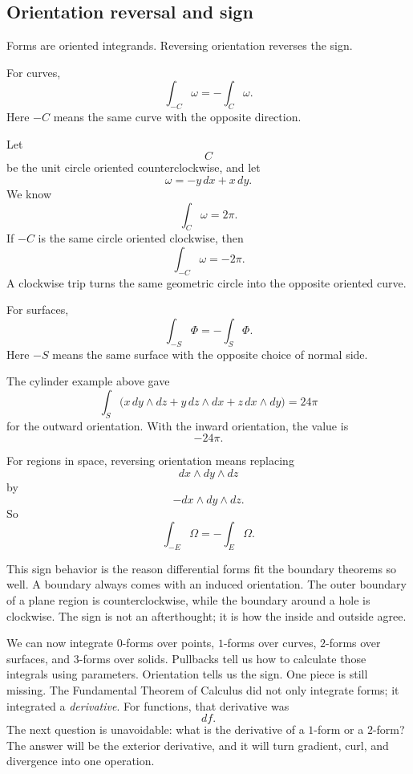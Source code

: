 \subsection{Orientation reversal and sign}

Forms are oriented integrands.  Reversing orientation reverses the sign.

For curves,
\[
\boxed{
    \int_{-C}\omega=-\int_C\omega.
}
\]
Here \(-C\) means the same curve with the opposite direction.

\begin{example}
Let
\[
    C
\]
be the unit circle oriented counterclockwise, and let
\[
    \omega=-y\,dx+x\,dy.
\]
We know
\[
    \int_C\omega=2\pi.
\]
If \(-C\) is the same circle oriented clockwise, then
\[
\boxed{
    \int_{-C}\omega=-2\pi.
}
\]
A clockwise trip turns the same geometric circle into the opposite oriented curve.
\end{example}

For surfaces,
\[
\boxed{
    \int_{-S}\Phi=-\int_S\Phi.
}
\]
Here \(-S\) means the same surface with the opposite choice of normal side.

The cylinder example above gave
\[
    \int_S
    \bigl(x\,dy\wedge dz+y\,dz\wedge dx+z\,dx\wedge dy\bigr)
    =
    24\pi
\]
for the outward orientation.  With the inward orientation, the value is
\[
    -24\pi.
\]

For regions in space, reversing orientation means replacing
\[
    dx\wedge dy\wedge dz
\]
by
\[
    -dx\wedge dy\wedge dz.
\]
So
\[
\boxed{
    \int_{-E}\Omega=-\int_E\Omega.
}
\]

This sign behavior is the reason differential forms fit the boundary theorems so well.
A boundary always comes with an induced orientation.  The outer boundary of a plane
region is counterclockwise, while the boundary around a hole is clockwise.  The sign is
not an afterthought; it is how the inside and outside agree.

We can now integrate \(0\)-forms over points, \(1\)-forms over curves, \(2\)-forms over
surfaces, and \(3\)-forms over solids.  Pullbacks tell us how to calculate those integrals
using parameters.  Orientation tells us the sign.  One piece is still missing.  The
Fundamental Theorem of Calculus did not only integrate forms; it integrated a
\emph{derivative}.  For functions, that derivative was
\[
    df.
\]
The next question is unavoidable: what is the derivative of a \(1\)-form or a \(2\)-form?
The answer will be the exterior derivative, and it will turn gradient, curl, and
divergence into one operation.

